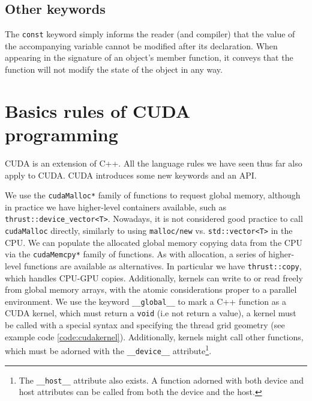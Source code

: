 \documentclass[ twoside,openright,titlepage,numbers=noenddot,%
headinclude,footinclude,cleardoublepage=empty,abstract=on,
BCOR=5mm,paper=b5,fontsize=11pt, dvipsnames
]{scrreprt}
\def\ucpp{uammd_cpp_lexer.py:UAMMDCppLexer -x}
\newcommand{\gpu}{\gls{GPU}\xspace}
\begin{document}
\subsection*{Other keywords}
The \texttt{const} keyword simply informs the reader (and compiler) that the value of the accompanying variable cannot be modified after its declaration. When appearing in the signature of an object's member function, it conveys that the function will not modify the state of the object in any way.

\section{Basics rules of CUDA programming}
CUDA is an extension of C++. All the language rules we have seen thus far also apply to CUDA. CUDA introduces some new keywords and an \gls{API}.

We use the \texttt{cudaMalloc*} family of functions to request global memory, although in practice we have higher-level containers available, such as \texttt{thrust::device_vector<T>}. Nowadays, it is not considered good practice to call \texttt{cudaMalloc} directly, similarly to using \texttt{malloc/new} vs. \texttt{std::vector<T>} in the CPU.
We can populate the allocated global memory copying data from the CPU via the \texttt{cudaMemcpy*} family of functions. As with allocation, a series of higher-level functions are available as alternatives. In particular we have \texttt{thrust::copy}, which handles CPU-\gpu copies. Additionally, kernels can write to or read freely from global memory arrays, with the atomic considerations proper to a parallel environment.
We use the keyword \texttt{__global__} to mark a C++ function as a CUDA kernel, which must return a \texttt{void} (i.e not return a value), a kernel must be called with a special syntax and specifying the thread grid geometry (see example code \ref{code:cudakernel}).
Additionally, kernels might call other functions, which must be adorned with the \texttt{__device__} attribute\footnote{The \texttt{__host__} attribute also exists. A function adorned with both device and host attributes can be called from both the device and the host.}.
\end{document}
